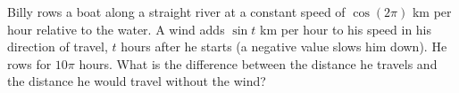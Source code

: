 Billy rows a boat along a straight river at a constant speed of $\cos(2\pi)$ km per hour relative to the water. A wind adds $\sin t$ km per hour to his speed in his direction of travel, $t$ hours after he starts (a negative value slows him down). He rows for $10\pi$ hours. What is the difference between the distance he travels and the distance he would travel without the wind?
